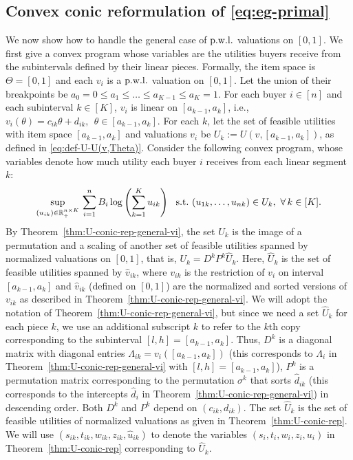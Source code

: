 \subsection{Convex conic reformulation of \eqref{eq:eg-primal}} \label{subsec:convex-conic-reform-of-EG-pwl}
We now show how to handle the general case of ${\rm p.w.l.}$ valuations on $[0,1]$.
We first give a convex program whose variables are the utilities buyers receive from the subintervals defined by their linear pieces.
Formally, the item space is $\Theta = [0,1]$ and each $v_i$ is a ${\rm p.w.l.}$ valuation on $[0,1]$. Let the union of their breakpoints be $a_0 = 0 \leq a_1 \leq \dots \leq a_{K-1} \leq a_K = 1$. 
For each buyer $i\in [n]$ and each subinterval $k\in [K]$, $v_i$ is linear on $[a_{k-1}, a_k]$, i.e., 
$v_i(\theta) = c_{ik} \theta + d_{ik},\ \ \theta \in [a_{k-1}, a_k]$.
For each $k$, let the set of feasible utilities with item space $[a_{k-1},a_k]$ and valuations $v_i$ be $U_k := U(v, [a_{k-1}, a_k])$,
as defined in \eqref{eq:def-U-U(v,Theta)}. 
Consider the following convex program, whose variables denote how much utility each buyer $i$ receives from each linear segment $k$:
\begin{align}
	\sup_{(u_{ik}) \in \mathbb{R}_+^{n\times K} } \, \sum_{i=1}^n B_i \log \left(\sum_{k=1}^K u_{ik}\right) \ \ {\rm s.t.}\  (u_{1k}, \dots, u_{nk}) \in U_{k},\ \forall\,k \in [K].
	\label{eq:convex-prog-u(ik)}
\end{align}
By Theorem~\ref{thm:U-conic-rep-general-vi}, the set $U_k$ is the image of a permutation and a scaling of another set of feasible utilities spanned by normalized valuations on $[0,1]$, that is, 
$U_k = D^k P^k \hat{U}_k$.
Here, $\hat{U}_k$ is the set of feasible utilities spanned by $\hat{v}_{ik}$, where $v_{ik}$ is the restriction of $v_i$ on interval $[a_{k-1}, a_k]$ and $\hat{v}_{ik}$ (defined on $[0,1]$) are the normalized and sorted versions of $v_{ik}$ as described in Theorem~\ref{thm:U-conic-rep-general-vi}. 
We will adopt the notation of Theorem~\ref{thm:U-conic-rep-general-vi}, but since we need a set $\hat U_k$ for each piece $k$, we use an additional subscript $k$ to refer to the $k$th copy corresponding to the subinterval $[l,h] = [a_{k-1}, a_k]$.
Thus, $D^k$ is a diagonal matrix with diagonal entries $\Lambda_{ik} = v_i([a_{k-1}, a_k])$ (this corresponds to $\Lambda_i$ in Theorem~\ref{thm:U-conic-rep-general-vi} with $[l,h] = [a_{k-1}, a_k]$), $P^k$ is a permutation matrix corresponding to the permutation $\sigma^k$ that sorts $\hat{d}_{ik}$ (this corresponds to the intercepts $\hat{d}_i$ in Theorem~\ref{thm:U-conic-rep-general-vi}) in descending order. 
Both $D^k$ and $P^k$ depend on $(c_{ik}, d_{ik})$. 
The set $\hat{U}_k$ is the set of feasible utilities of normalized valuations as given in Theorem~\ref{thm:U-conic-rep}. 
We will use $(s_{ik}, t_{ik}, w_{ik}, z_{ik}, \hat{u}_{ik})$ to denote the  variables $(s_i, t_i, w_i, z_i, u_i)$ in Theorem~\ref{thm:U-conic-rep} corresponding to $\hat U_k$.

